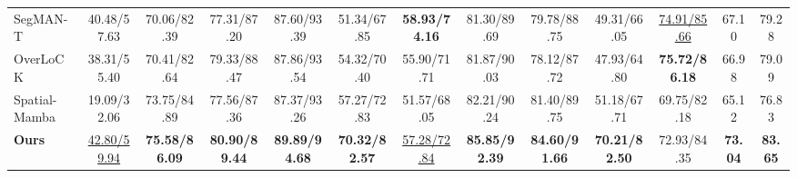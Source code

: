 \documentclass[lettersize,journal]{IEEEtran}
\begin{document}
\begin{table}[!t]
\begin{tabular}{lcccccccccccc}
SegMAN-T\cite{SegMAN} &40.48/57.63 & 70.06/82.39 & 77.31/87.20 & 87.60/93.39 & 51.34/67.85 & \textbf{58.93/74.16} & 81.30/89.69 & 79.78/88.75 & 49.31/66.05 & \underline{74.91/85.66} & 67.10 & 79.28 \\
OverLoCK\cite{lou2025overlock} &38.31/55.40 & 70.41/82.64 & 79.33/88.47 & 87.86/93.54 & 54.32/70.40 & 55.90/71.71 & 81.87/90.03 & 78.12/87.72 & 47.93/64.80 & \textbf{75.72/86.18} & 66.98 & 79.09 \\
Spatial-Mamba\cite{xiao2025spatialmamba} &19.09/32.06 & 73.75/84.89 & 77.56/87.36 & 87.37/93.26 & 57.27/72.83 & 51.57/68.05 & 82.21/90.24 & 81.40/89.75 & 51.18/67.71 & 69.75/82.18 & 65.12 & 76.83 \\
\hline
\textbf{Ours} & \underline{42.80/59.94} & \textbf{75.58/86.09} & \textbf{80.90/89.44} & \textbf{89.89/94.68} & \textbf{70.32/82.57} & \underline{57.28/72.84} & \textbf{85.85/92.39} & \textbf{84.60/91.66} & \textbf{70.21/82.50} & 72.93/84.35 & \textbf{73.04} & \textbf{83.65} \\
\hline
\end{tabular}
\vspace{1mm}
\end{table}
\end{document}

